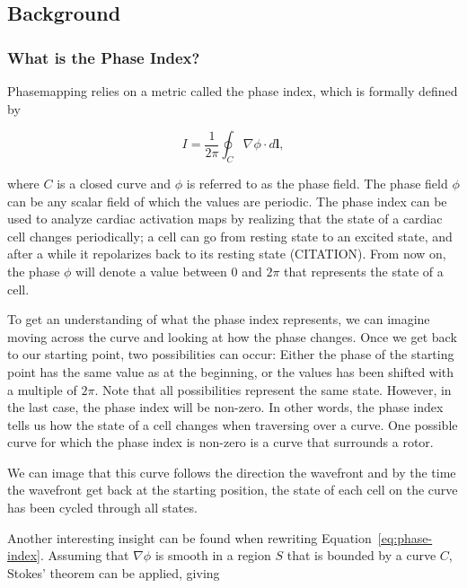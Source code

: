 \documentclass[twocolumn]{article}
\begin{document}
\subsection{Background}

\subsubsection{What is the Phase Index?}

Phasemapping relies on a metric called the phase index,
which is formally defined by

\begin{equation}
  I = \frac{1}{2\pi}\oint_C \nabla \phi \cdot d\bm{l} ,
  \label{eq:phase-index}
\end{equation}

\noindent where $C$ is a closed curve
and $\phi$ is referred to as the phase field.
The phase field $\phi$ can be any scalar field of which the values are periodic.
The phase index can be used to analyze cardiac activation maps
by realizing that the state of a cardiac cell changes periodically;
a cell can go from resting state to an excited state,
and after a while it repolarizes back to its resting state (CITATION).
From now on, the phase $\phi$ will denote a value between $0$ and $2\pi$
that represents the state of a cell.


To get an understanding of what the phase index represents,
we can imagine moving across the curve
and looking at how the phase changes.
Once we get back to our starting point,
two possibilities can occur:
Either the phase of the starting point has the same value as at the beginning,
or the values has been shifted with a multiple of $2\pi$.
Note that all possibilities represent the same state.
However, in the last case, the phase index will be non-zero.
In other words, the phase index tells us how the state of a cell changes when traversing over a curve.
One possible curve for which the phase index is non-zero is a curve that surrounds a rotor.


We can image that this curve follows the direction the wavefront
and by the time the wavefront get back at the starting position,
the state of each cell on the curve has been cycled through all states.

Another interesting insight can be found when rewriting Equation~\ref{eq:phase-index}.
Assuming that $\nabla\phi$ is smooth in a region $S$ that is bounded by a curve $C$,
Stokes' theorem can be applied, giving
\end{document}
